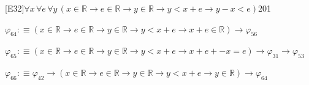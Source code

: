 \begin{fullproof}{[E32]}{$\forall x\,\forall e\,\forall y\,(x \in \mathbb{R} \to e \in \mathbb{R} \to y \in \mathbb{R} \to y < x + e \to y - x < e)$}{201}
\begin{abbrevlist}
\item $\varphi_{64} :\equiv (x \in \mathbb{R} \to e \in \mathbb{R} \to y \in \mathbb{R} \to y < x + e \to x + e \in \mathbb{R}) \to \varphi_{56}$
\item $\varphi_{65} :\equiv (x \in \mathbb{R} \to e \in \mathbb{R} \to y \in \mathbb{R} \to y < x + e \to x + e + -x = e) \to \varphi_{31} \to \varphi_{53}$
\item $\varphi_{66} :\equiv \varphi_{42} \to (x \in \mathbb{R} \to e \in \mathbb{R} \to y \in \mathbb{R} \to y < x + e \to y \in \mathbb{R}) \to \varphi_{64}$
\end{abbrevlist}
\end{fullproof}
